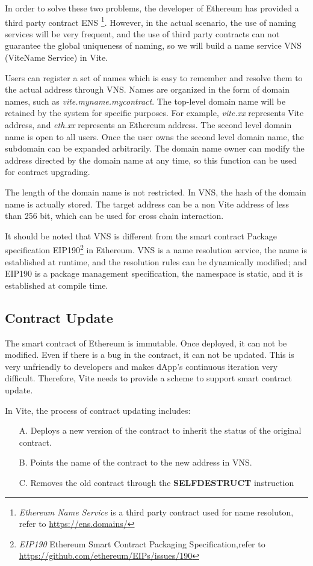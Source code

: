 \documentclass[UTF8,nofonts]{article}
\begin{document}
\begin{multicols}{2}
In order to solve these two problems, the developer of Ethereum has provided a third party contract ENS \footnote{\textit{Ethereum Name Service} is a third party contract used for name resoluton, refer to \url{https://ens.domains/}}. However, in the actual scenario, the use of naming services will be very frequent, and the use of third party contracts can not guarantee the global uniqueness of naming, so we will build a name service VNS (ViteName Service) in Vite.

Users can register a set of names which is easy to remember and resolve them to the actual address through VNS. Names are organized in the form of domain names, such as \textit{vite.myname.mycontract}. The top-level domain name will be retained by the system for specific purposes. For example, \textit{vite.xx} represents Vite address, and \textit{eth.xx} represents an Ethereum address. The second level domain name is open to all users.  Once the user owns the second level domain name, the subdomain can be expanded arbitrarily. The domain name owner can modify the address directed by the domain name at any time, so this function can be used for contract upgrading.

The length of the domain name is not restricted. In VNS, the hash of the domain name is actually stored. The target address can be a non Vite address of less than 256 bit, which can be used for cross chain interaction.

It should be noted that VNS is different from the smart contract Package specification EIP190\footnote{\textit{EIP190} Ethereum Smart Contract Packaging Specification,refer to \url{https://github.com/ethereum/EIPs/issues/190}} in Ethereum. VNS is a name resolution service, the name is established at runtime, and the resolution rules can be dynamically modified; and EIP190 is a package management specification, the namespace is static, and it is established at compile time.

\subsection{Contract Update}
The smart contract of Ethereum is immutable. Once deployed, it can not be modified. Even if there is a bug in the contract, it can not be updated. This is very unfriendly to developers and makes dApp's continuous iteration very difficult. Therefore, Vite needs to provide a scheme to support smart contract update.

In Vite, the process of contract updating includes:
\begin{itemize}
	\item[A.] Deploys a new version of the contract to inherit the status of the original contract.
	\item[B.] Points the name of the contract to the new address in VNS.
	\item[C.] Removes the old contract through the \textbf{SELFDESTRUCT} instruction
\end{itemize}


\end{multicols}
\end{document}
